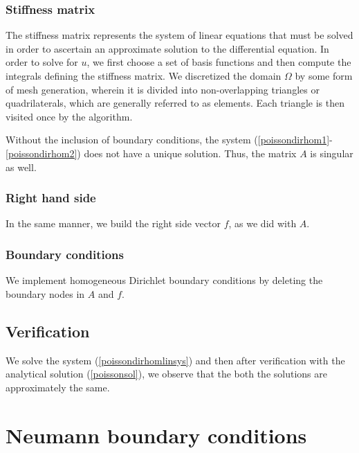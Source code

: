 \documentclass{report}
\begin{document}
\subsubsection{Stiffness matrix}

The stiffness matrix represents the system of linear equations that must be solved in order to ascertain an approximate solution to the differential equation. In order to solve for $u$, we first choose a set of basis functions and then compute the integrals defining the stiffness matrix. We discretized the domain $\Omega$ by some form of mesh generation, wherein it is divided into non-overlapping triangles or quadrilaterals, which are generally referred to as elements. Each triangle is then visited once by the algorithm.

Without the inclusion of boundary conditions, the system (\ref{poissondirhom1}-\ref{poissondirhom2}) does not have a unique solution. Thus, the matrix $A$ is singular as well.

\subsubsection{Right hand side}

In the same manner, we build the right side vector $f$, as we did with $A$.

\subsubsection{Boundary conditions}

We implement homogeneous Dirichlet boundary conditions by deleting the boundary nodes in $A$ and $f$.

\subsection{Verification}

We solve the system (\ref{poissondirhomlinsys}) and then after verification with the analytical solution (\ref{poissonsol}), we observe that the both the solutions are approximately the same.

\section{Neumann boundary conditions}
\end{document}
